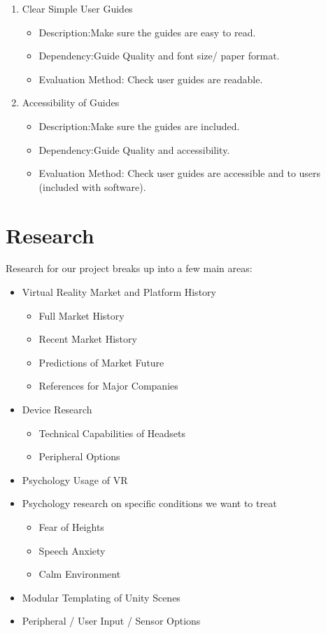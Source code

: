 \documentclass[a4paper,10pt]{article}
\begin{document}
	\begin{enumerate}
	  \item Clear Simple User Guides
	  \begin{itemize}
	    \item Description:Make sure the guides are easy to read.
	    \item  Dependency:Guide Quality and font size/ paper format.
	    \item Evaluation Method: Check user guides are readable.
	   \end{itemize}
	 \item Accessibility of Guides
	  \begin{itemize}
	    \item Description:Make sure the guides are included.
	    \item  Dependency:Guide Quality and accessibility.  
	    \item Evaluation Method: Check user guides are accessible and to users (included with software).
	   \end{itemize}
	\end{enumerate}

	
	
\pagebreak
\section{Research}
Research for our project breaks up into a few main areas:
\begin{itemize}
\item Virtual Reality Market and Platform History
	\begin{itemize}
	\item Full Market History
	\item Recent Market History
	\item Predictions of Market Future
	\item References for Major Companies
	\end{itemize}
\item Device Research
	\begin{itemize}
	\item Technical Capabilities of Headsets
	\item Peripheral Options
	\end{itemize}
\item Psychology Usage of VR
\item Psychology research on specific conditions we want to treat
	\begin{itemize}
	\item Fear of Heights
	\item Speech Anxiety
	\item Calm Environment
	\end{itemize}
\item Modular Templating of Unity Scenes
\item Peripheral / User Input / Sensor Options
\end{itemize}
\pagebreak
\end{document}

